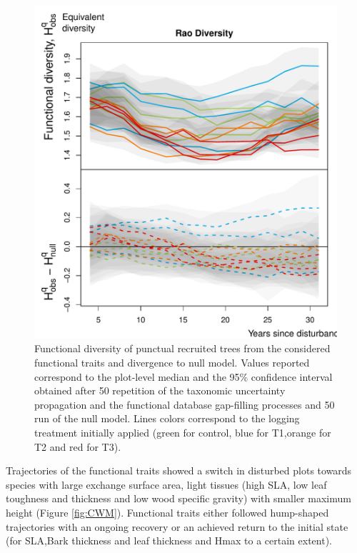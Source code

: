 \documentclass[fleqn,10pt]{ArtEcoFoG} %
\begin{document}
\begin{figure}

{\centering \includegraphics{RecruitmentTrajectories_files/figure-latex/FunTraj-1} 

}

\caption{Functional diversity of punctual recruited trees from the considered functional traits and divergence to null model. Values reported correspond to the plot-level median and the 95\% confidence interval obtained after 50 repetition of the taxonomic uncertainty propagation and the functional database gap-filling processes and 50 run of the null model. Lines colors correspond to the logging treatment initially applied (green for control, blue for T1,orange for T2 and red for T3).}\label{fig:FunTraj}
\end{figure}

Trajectories of the functional traits showed a switch in disturbed plots
towards species with large exchange surface area, light tissues (high
SLA, low leaf toughness and thickness and low wood specific gravity)
with smaller maximum height (Figure \ref{fig:CWM}). Functional traits
either followed hump-shaped trajectories with an ongoing recovery or an
achieved return to the initial state (for SLA,Bark thickness and leaf
thickness and Hmax to a certain extent).
\end{document}
